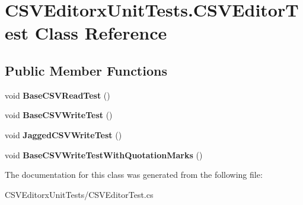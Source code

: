\hypertarget{class_c_s_v_editorx_unit_tests_1_1_c_s_v_editor_test}{}\section{C\+S\+V\+Editorx\+Unit\+Tests.\+C\+S\+V\+Editor\+Test Class Reference}
\label{class_c_s_v_editorx_unit_tests_1_1_c_s_v_editor_test}
\subsection*{Public Member Functions}
\begin{DoxyCompactItemize}
\item 
\mbox{\label{class_c_s_v_editorx_unit_tests_1_1_c_s_v_editor_test_acda71e0f3c1df9537e2a018a174e4861}} 
void {\bfseries Base\+C\+S\+V\+Read\+Test} ()
\item 
\mbox{\label{class_c_s_v_editorx_unit_tests_1_1_c_s_v_editor_test_ad0c70f809564dbd943415172f704af78}} 
void {\bfseries Base\+C\+S\+V\+Write\+Test} ()
\item 
\mbox{\label{class_c_s_v_editorx_unit_tests_1_1_c_s_v_editor_test_a8da2d9530daec856cc7a499184a98da7}} 
void {\bfseries Jagged\+C\+S\+V\+Write\+Test} ()
\item 
\mbox{\label{class_c_s_v_editorx_unit_tests_1_1_c_s_v_editor_test_a156702549dd0a3d96dd83a2f082b21a3}} 
void {\bfseries Base\+C\+S\+V\+Write\+Test\+With\+Quotation\+Marks} ()
\end{DoxyCompactItemize}


The documentation for this class was generated from the following file\+:\begin{DoxyCompactItemize}
\item 
C\+S\+V\+Editorx\+Unit\+Tests/C\+S\+V\+Editor\+Test.\+cs\end{DoxyCompactItemize}
